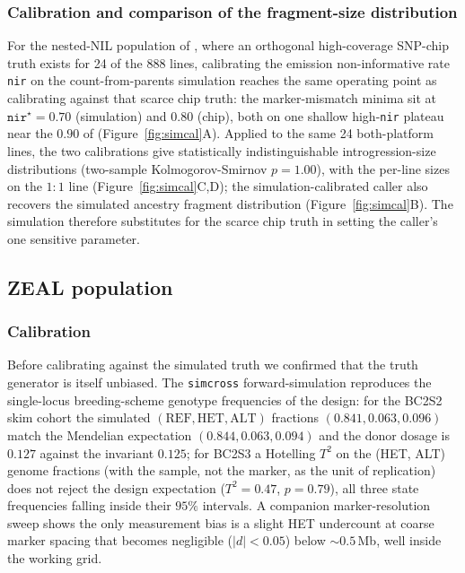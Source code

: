 \documentclass[9pt,twocolumn,twoside]{rilabRxiv}
\begin{document}
\subsubsection{Calibration and comparison of the fragment-size distribution}
For the nested-NIL population of \citet{zhong2025}, where an orthogonal high-coverage
SNP-chip truth exists for 24 of the 888 lines, calibrating the emission non-informative
rate \texttt{nir} on the count-from-parents simulation reaches the same operating point
as calibrating against that scarce chip truth: the marker-mismatch minima sit at
$\texttt{nir}^\star=0.70$ (simulation) and $0.80$ (chip), both on one shallow
high-\texttt{nir} plateau near the $0.90$ of \citet{zhong2025} (Figure~\ref{fig:simcal}A).
Applied to the same 24 both-platform lines, the two calibrations give statistically
indistinguishable introgression-size distributions (two-sample Kolmogorov-Smirnov
$p=1.00$), with the per-line sizes on the $1{:}1$ line (Figure~\ref{fig:simcal}C,D); the
simulation-calibrated caller also recovers the simulated ancestry fragment distribution
(Figure~\ref{fig:simcal}B). The simulation therefore substitutes for the scarce chip
truth in setting the caller's one sensitive parameter.

\subsection{ZEAL population}

\subsubsection{Calibration}
Before calibrating against the simulated truth we confirmed that the truth generator
is itself unbiased. The \texttt{simcross} forward-simulation reproduces the
single-locus breeding-scheme genotype frequencies of the design: for the BC2S2 skim
cohort the simulated $(\mathrm{REF},\mathrm{HET},\mathrm{ALT})$ fractions
$(0.841,0.063,0.096)$ match the Mendelian expectation $(0.844,0.063,0.094)$ and the
donor dosage is $0.127$ against the invariant $0.125$; for BC2S3 a Hotelling $T^2$ on
the (HET, ALT) genome fractions (with the sample, not the marker, as the unit of
replication) does not reject the design expectation ($T^2=0.47$, $p=0.79$), all
three state frequencies falling inside their $95\%$ intervals. A companion
marker-resolution sweep shows the only measurement bias is a slight HET undercount at
coarse marker spacing that becomes negligible ($|d|<0.05$) below ${\sim}0.5$\,Mb, well
inside the working grid.
\end{document}
